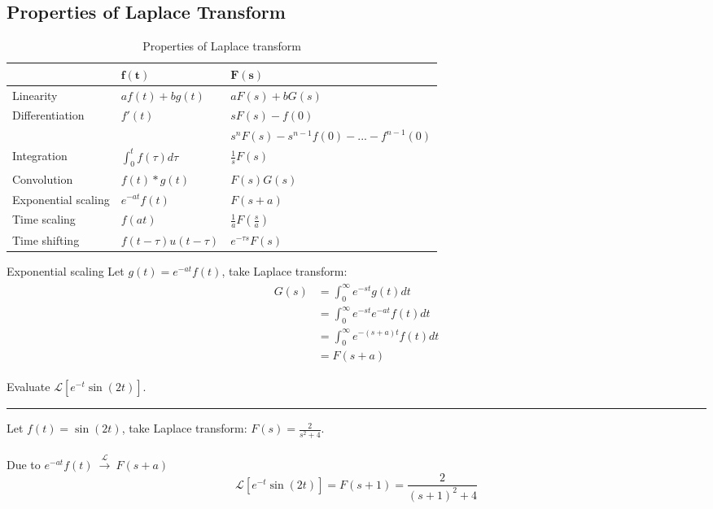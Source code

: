 \subsection{Properties of Laplace Transform}
\begin{table}[H]\centering
    \caption{Properties of Laplace transform}
    \begin{tabular}{p{4cm} p{3cm} p{6cm}}
    \toprule
    & $\boldsymbol{f(t)}$ & $\boldsymbol{F(s)}$\\ \midrule
    Linearity & $af(t)+bg(t)$ & $aF(s)+bG(s)$ \\ [1.5ex] 
    
    Differentiation & $f'(t)$  & $ sF(s)-f(0)$ \\
    &&$s^{n}F(s)-s^{n-1}f(0)-...-  f^{n-1}(0)$\\[1.5ex] 
    
    Integration& $\int_{0}^{t}f(\tau)d\tau$ &  $\displaystyle \frac{1}{s} F(s)$  \\  [1.5ex] 
    Convolution&  $f(t)*g(t)$ & $F(s)G(s)$  \\ [1.5ex]
    
    Exponential scaling & $e^{-at}f(t)$ & $F(s+a)$  \\ [1.5ex] 
    
    Time scaling & $f(at)$ & $\displaystyle \frac{1}{a}F(\frac{s}{a})$\\ [1.5ex] 
    
    Time shifting & $f(t-\tau)u(t-\tau)$ & $e^{-\tau s}F(s)$ \\ [1.5ex] 
    \bottomrule
\end{tabular}
\end{table}

\begin{dv}{Exponential scaling}
Let $g(t)=e^{-at}f(t)$, take Laplace transform:
\begin{align*} 
    \begin{split}
        G(s) &= \int_{0}^{\infty}e^{-st}g(t) dt\\
        &=\int_{0}^{\infty}e^{-st}e^{-at}f(t) dt\\
        &= \int_{0}^{\infty}e^{-(s+a)t}f(t) dt\\
        &= F(s+a)
    \end{split} 
\end{align*}
\end{dv}
\begin{ex}{}
Evaluate $ \mathcal{L}[e^{-t}\sin(2t)]$.
\vspace{.3cm} \hrule \vspace{.3cm} 
Let $f(t) = \sin(2t)$, take Laplace transform: $\displaystyle F(s) = \frac{2}{s^{2}+4}$.\\\\
Due to $e^{-at}f(t) \ \xrightarrow{\mathcal{L}}  \ F(s+a)$
\[\mathcal{L}[e^{-t}\sin(2t)] = F(s+1) = \frac{2}{(s+1)^{2}+4}\]
\end{ex}
